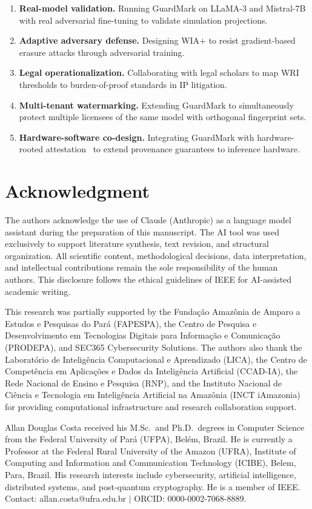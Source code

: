 \documentclass[journal,compsoc]{IEEEtran}
\begin{document}
\begin{enumerate}
  \item \textbf{Real-model validation.} Running GuardMark on LLaMA-3 and
    Mistral-7B with real adversarial fine-tuning to validate simulation
    projections.
  \item \textbf{Adaptive adversary defense.} Designing WIA+ to resist
    gradient-based erasure attacks through adversarial training.
  \item \textbf{Legal operationalization.} Collaborating with legal scholars
    to map WRI thresholds to burden-of-proof standards in IP litigation.
  \item \textbf{Multi-tenant watermarking.} Extending GuardMark to
    simultaneously protect multiple licensees of the same model with
    orthogonal fingerprint sets.
  \item \textbf{Hardware-software co-design.} Integrating GuardMark with
    hardware-rooted attestation~\cite{peng2024securing} to extend provenance
    guarantees to inference hardware.
\end{enumerate}

\section*{Acknowledgment}

The authors acknowledge the use of Claude (Anthropic) as a language model
assistant during the preparation of this manuscript. The AI tool was used
exclusively to support literature synthesis, text revision, and structural
organization. All scientific content, methodological decisions, data
interpretation, and intellectual contributions remain the sole responsibility
of the human authors. This disclosure follows the ethical guidelines of IEEE
for AI-assisted academic writing.

This research was partially supported by the Fundação Amazônia de Amparo a
Estudos e Pesquisas do Pará (FAPESPA), the Centro de Pesquisa e
Desenvolvimento em Tecnologias Digitais para Informação e Comunicação
(PRODEPA), and SEC365 Cybersecurity Solutions. The authors also thank the
Laboratório de Inteligência Computacional e Aprendizado (LICA), the Centro de
Competência em Aplicações e Dados da Inteligência Artificial (CCAD-IA), the
Rede Nacional de Ensino e Pesquisa (RNP), and the Instituto Nacional de
Ciência e Tecnologia em Inteligência Artificial na Amazônia (INCT iAmazonia)
for providing computational infrastructure and research collaboration support.

\begin{IEEEbiographynophoto}{Allan Douglas Costa}
received his M.Sc.\ and Ph.D.\ degrees in Computer Science from the
Federal University of Pará (UFPA), Belém, Brazil. He is currently a
Professor at the Federal Rural University of the Amazon (UFRA), Institute of
Computing and Information and Communication Technology (ICIBE), Belem, Para,
Brazil. His research interests include cybersecurity, artificial intelligence,
distributed systems, and post-quantum cryptography. He is a member of IEEE.
Contact: allan.costa@ufra.edu.br $|$ ORCID: 0000-0002-7068-8889.
\end{IEEEbiographynophoto}



\end{document}
